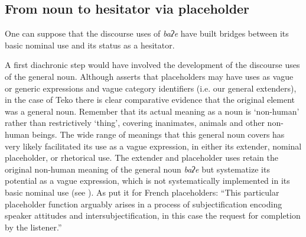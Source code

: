 \documentclass[output=paper]{langscibook}
\begin{document}
\subsection{From noun to hesitator via placeholder}
\label{sec:rose:5.2}
One can suppose that the discourse uses of \textit{baʔe} have built bridges between its basic nominal use and its status as a hesitator. 

A first diachronic step would have involved the development of the discourse uses of the general noun. Although \citet[26]{Podlesskaya2010} asserts that placeholders may have uses as vague or generic expressions and vague category identifiers (i.e. our general extenders), in the case of Teko there is clear comparative evidence that the original element was a general noun. Remember that its actual meaning as a noun is ‘non-human’ rather than restrictively ‘thing’, covering inanimates, animals and other non-human beings. The wide range of meanings that this general noun covers has very likely facilitated its use as a vague expression, in either its extender,  nominal placeholder, or rhetorical use. The extender and placeholder uses retain the original non-human meaning of the general noun \textit{baʔe} but systematize its potential as a vague expression, which is not systematically implemented in its basic nominal use (see ). As \citet[300]{HenneckeHennecke2022} put it for French placeholders: “This particular placeholder function arguably arises in a process of subjectification encoding speaker attitudes and intersubjectification, in this case the request for completion by the listener.” 
\end{document}
